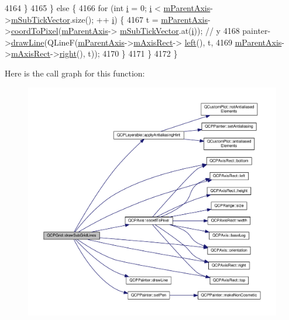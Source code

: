 \begin{DoxyCode}
4164     \}
4165   \} \textcolor{keywordflow}{else} \{
4166     \textcolor{keywordflow}{for} (\textcolor{keywordtype}{int} \hyperlink{_comparision_pictures_2_createtest_image_8m_a6f6ccfcf58b31cb6412107d9d5281426}{i} = 0; \hyperlink{_comparision_pictures_2_createtest_image_8m_a6f6ccfcf58b31cb6412107d9d5281426}{i} < \hyperlink{class_q_c_p_grid_a9a8a76731e6e737b65b929fd1995cc88}{mParentAxis}->\hyperlink{class_q_c_p_axis_a28353081e0ff35c3fe5ced923a287faa}{mSubTickVector}.size(); ++
      \hyperlink{_comparision_pictures_2_createtest_image_8m_a6f6ccfcf58b31cb6412107d9d5281426}{i}) \{
4167       t = \hyperlink{class_q_c_p_grid_a9a8a76731e6e737b65b929fd1995cc88}{mParentAxis}->\hyperlink{class_q_c_p_axis_a985ae693b842fb0422b4390fe36d299a}{coordToPixel}(\hyperlink{class_q_c_p_grid_a9a8a76731e6e737b65b929fd1995cc88}{mParentAxis}->
      \hyperlink{class_q_c_p_axis_a28353081e0ff35c3fe5ced923a287faa}{mSubTickVector}.at(\hyperlink{_comparision_pictures_2_createtest_image_8m_a6f6ccfcf58b31cb6412107d9d5281426}{i})); \textcolor{comment}{// y}
4168       painter->\hyperlink{class_q_c_p_painter_a0b4b1b9bd495e182c731774dc800e6e0}{drawLine}(QLineF(\hyperlink{class_q_c_p_grid_a9a8a76731e6e737b65b929fd1995cc88}{mParentAxis}->\hyperlink{class_q_c_p_axis_a6f150b65a202f32936997960e331dfcb}{mAxisRect}->
      \hyperlink{class_q_c_p_axis_rect_a55b3ecf72a3a65b053f7651b88db458d}{left}(), t,
4169                                \hyperlink{class_q_c_p_grid_a9a8a76731e6e737b65b929fd1995cc88}{mParentAxis}->\hyperlink{class_q_c_p_axis_a6f150b65a202f32936997960e331dfcb}{mAxisRect}->\hyperlink{class_q_c_p_axis_rect_a6d0f989fc552aa2b563cf82f8fc81e61}{right}(), t));
4170     \}
4171   \}
4172 \}
\end{DoxyCode}


Here is the call graph for this function\+:\nopagebreak
\begin{figure}[H]
\begin{center}
\leavevmode
\includegraphics[width=350pt]{class_q_c_p_grid_afa5d9d12de419e881f381f2ab7cb414d_cgraph}
\end{center}
\end{figure}




